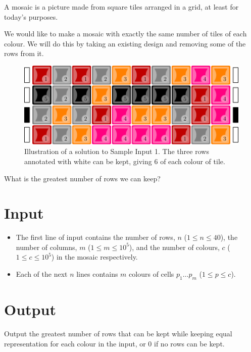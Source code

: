 
A mosaic is a picture made from square tiles arranged in a grid, at least for
today's purposes.

We would like to make a mosaic with exactly the same number of tiles of each
colour. We will do this by taking an existing design and removing some of the
rows from it.

\begin{figure}[h!]
  \centering
  \includegraphics[width=1.0\textwidth]{sample}
  \caption{Illustration of a solution to Sample Input 1. The three rows
  annotated with white can be kept, giving $6$ of each colour of tile.}
  \label{fig:mosaic}
\end{figure}

What is the greatest number of rows we can keep?

\section*{Input}

\begin{itemize}
  \item The first line of input contains
        the number of rows, $n$ ($1 \le n \le 40$),
        the number of columns, $m$ ($1 \le m \le 10^5$), and
        the number of colours, $c$ ($1 \le c \le 10^5$) in the mosaic
        respectively.
  \item Each of the next $n$ lines contains $m$ colours of cells
        $p_1 \ldots p_m$ ($1 \le p \le c$).
\end{itemize}

\section*{Output}

Output the greatest number of rows that can be kept while keeping equal
representation for each colour in the input, or $0$ if no rows can be kept.
